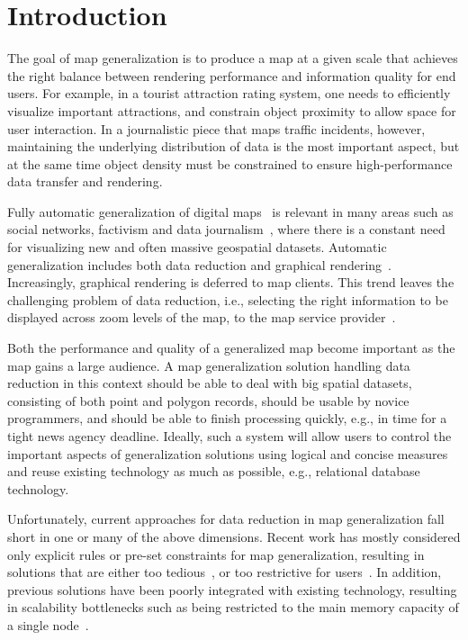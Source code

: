 \documentclass[11pt, oneside]{report}
\begin{document}
{\section{Introduction}
\label{sec:cvl:introduction}
The goal of map generalization is to produce a map at a given scale that achieves the right balance between rendering performance and information quality for end users. For example, in a tourist attraction rating system, one needs to efficiently visualize important attractions, and constrain object proximity to allow space for user interaction. In a journalistic piece that maps traffic incidents, however, maintaining the underlying distribution of data is the most important aspect, but at the same time object density must be constrained to ensure high-performance data transfer and rendering.

Fully automatic generalization of digital maps~\cite{sarma2012fusiontables,nutanong2012multiresolution} is relevant in many areas such as social networks, factivism and data journalism~\cite{cohen2011journalism,bono,sankaranarayanan2009twitterstand}, where there is a constant need for visualizing new and often massive geospatial datasets. Automatic generalization includes both data reduction and graphical rendering~\cite{weibel1999generalising,gruenreich1985cag}. Increasingly, graphical rendering is deferred to map clients. This trend leaves the challenging problem of data reduction, i.e., selecting the right information to be displayed across zoom levels of the map, to the map service provider~\cite{gaffuri12vectortiles}. 

Both the performance and quality of a generalized map become important as the map gains a large audience. A map generalization solution handling data reduction in this context should be able to deal with big spatial datasets, consisting of both point and polygon records, should be usable by novice programmers, and should be able to finish processing quickly, e.g., in time for a tight news agency deadline. Ideally, such a system will allow users to control the important aspects of generalization solutions using logical and concise measures and reuse existing technology as much as possible, e.g., relational database technology.

Unfortunately, current approaches for data reduction in map generalization fall short in one or many of the above dimensions. Recent work has mostly considered only explicit rules or pre-set constraints for map generalization, resulting in solutions that are either too tedious~\cite{sld,mapnik}, or too restrictive for users~\cite{sarma2012fusiontables,nutanong2012multiresolution}. In addition, previous solutions have been poorly integrated with existing technology, resulting in scalability bottlenecks such as being restricted to the main memory capacity of a single node~\cite{sarma2012fusiontables}. 
 

}
\end{document}

